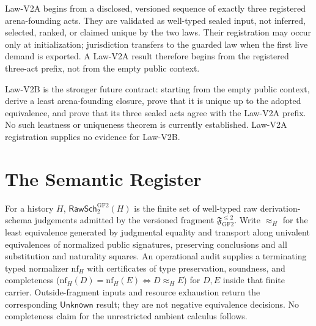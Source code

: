 \begin{definition}
Law-V2A begins from a disclosed, versioned sequence of exactly three
registered arena-founding acts. They are validated as well-typed sealed input,
not inferred, selected, ranked, or claimed unique by the two laws. Their
registration may occur only at initialization; jurisdiction transfers to the
guarded law when the first live demand is exported. A Law-V2A result therefore
begins from the registered three-act prefix, not from the empty public
context.
\end{definition}

\begin{definition}
Law-V2B is the stronger future contract: starting from the empty public
context, derive a least arena-founding closure, prove that it is unique up to
the adopted equivalence, and prove that its three sealed acts agree with the
Law-V2A prefix. No such leastness or uniqueness theorem is currently
established. Law-V2A registration supplies no evidence for Law-V2B.
\end{definition}

\section{The Semantic Register}\label{sec:semantic-register}

\begin{definition}
For a history \(H\),
\(\mathsf{RawSch}^{\mathrm{GF2}}_2(H)\) is the finite set of well-typed raw
derivation-schema judgements admitted by the versioned fragment
\(\mathfrak F_{\mathrm{GF2}}^{\le2}\). Write
\(\approx_H\) for the least equivalence generated by judgmental equality and
transport along univalent equivalences of normalized public signatures,
preserving conclusions and all substitution and naturality squares. An
operational audit supplies a terminating typed normalizer
\(\mathrm{nf}_H\) with certificates of type preservation, soundness, and
completeness (\(\mathrm{nf}_H(D)=\mathrm{nf}_H(E) \Leftrightarrow D\approx_H
E\)) for \(D,E\) inside that finite carrier. Outside-fragment inputs and
resource exhaustion return the corresponding \(\mathsf{Unknown}\) result;
they are not negative equivalence decisions. No completeness claim for the
unrestricted ambient calculus follows.
\end{definition}

